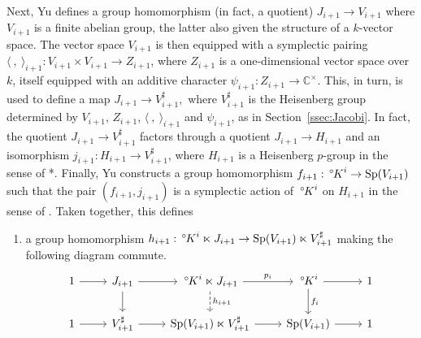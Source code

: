 \documentclass[10pt]{amsart}
\makeatletter
\theoremstyle{plain}
\theoremstyle{definition}
\newcommand{\CC}{{\mathbb{C}}}
\newcommand{\Fq}{k}
\newcommand{\labitem}[2]{
\def\@itemlabel{\textbf{#1}}
\item
\def\@currentlabel{#1}\label{#2}}
\newcommand{\Sp}{{\operatorname{Sp}}}
\newcommand{\oK}{{\,^\circ \hskip-1pt K}}
\makeatother
\begin{document}
Next, Yu defines a group homomorphism (in fact, a quotient) 
$
J_{i+1} \to V_{i+1}
$
where $V_{i+1}$ is a finite abelian group, the latter also given the structure of a $\Fq$-vector space.
The vector space $V_{i+1}$ is then equipped with a symplectic pairing $\langle\ ,\ \rangle_{i+1} : V_{i+1}\times V_{i+1} \to Z_{i+1}$, where $Z_{i+1}$ is a one-dimensional vector space over $\Fq$, itself equipped with an additive character $\psi_{i+1} : Z_{i+1} \to \CC^\times$.
This, in turn, is used to define a map
$
J_{i+1} \to V_{i+1}^\sharp,
$
where $V_{i+1}^\sharp$ is the Heisenberg group determined by $V_{i+1}$, $Z_{i+1}$, $\langle\ ,\ \rangle_{i+1}$ and $\psi_{i+1}$, as in Section~\ref{ssec:Jacobi}.
In fact, the quotient $J_{i+1} \to V_{i+1}^\sharp$ factors through a quotient $J_{i+1} \to H_{i+1}$ and an isomorphism $j_{i+1} : H_{i+1} \to V_{i+1}^\sharp$, where $H_{i+1}$ is a Heisenberg $p$-group in the sense of \cite{yu:01a}*{}.
Finally, Yu constructs a group homomorphism $f_{i+1} : \oK^i \to \Sp(V_{i+1})$ such that the pair $(f_{i+1}, j_{i+1})$ is a symplectic action of $\oK^i$ on $H_{i+1}$ in the sense of \cite{yu:01a}.
%
Taken together, this defines
\begin{enumerate}
\labitem{Y4}{Y4}  
a group homomorphism $h_{i+1} : \oK^i \ltimes J_{i+1} \to  \Sp(V_{i+1})\ltimes V_{i+1}^\sharp$ making the following diagram commute.
\[
\begin{tikzcd}
1 \arrow{r} & J_{i+1} \arrow{d} \arrow{r} & \oK^i \ltimes J_{i+1} \arrow[dashed]{d}{h_{i+1}} \arrow{r}{p_i} & \oK^i \arrow{r} \arrow{d}{f_i} & 1\\ 
1 \arrow{r} & V_{i+1}^\sharp \arrow{r} & \Sp(V_{i+1}) \ltimes V_{i+1}^\sharp \arrow{r} & \Sp(V_{i+1}) \arrow{r} & 1
\end{tikzcd}
\]
\end{enumerate}
\end{document}
